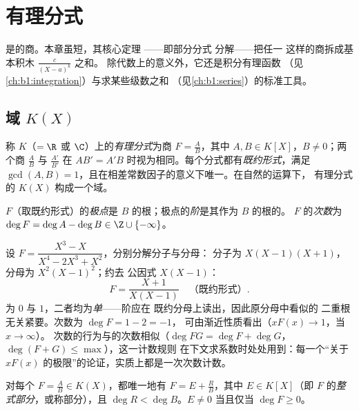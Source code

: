 \chapter{有理分式}\label{ch:b1:fractions}

是的商。本章虽短，其核心定理
——即部分分式
分解——把任一
这样的商拆成基本积木 $\frac{c}{(X - a)^k}$ 之和。
除代数上的意义外，它还是积分有理函数
（见\cref{ch:b1:integration}）与求某些级数之和
（见\cref{ch:b1:series}）的标准工具。

\section{域 $K(X)$}

\begin{definition}\label{def:b1:fractions:field}
称 $K$（$= \R$
或 $\C$）上的\emph{有理分式}为商 $F = \frac{A}{B}$，其中 $A, B \in K[X]$，$B \neq
0$；两个商 $\frac AB$ 与 $\frac{A'}{B'}$ 在
$AB' = A'B$ 时视为相同。每个分式都有\emph{既约形式}，满足
$\gcd(A, B) = 1$，且在相差常数因子的意义下唯一。在自然的运算下，
有理分式的 $K(X)$ 构成一个域。

$F$（取既约形式）的\emph{极点}是
$B$ 的根；极点的\emph{阶}是其作为 $B$ 的根的。
$F$ 的\emph{次数}为 $\deg F = \deg A - \deg B \in \Z \cup
\{-\infty\}$。
\end{definition}

\begin{example}\label{ex:b1:fractions:vocab}
设 $F = \dfrac{X^3 - X}{X^4 - 2X^3 + X^2}$，分别分解分子与分母：
分子为 $X(X-1)(X+1)$，分母为 $X^2(X-1)^2$；约去
公因式 $X(X-1)$：
\[
F = \frac{X + 1}{X(X - 1)} \quad\text{（既约形式）.}
\]
为 $0$ 与 $1$，二者均为\emph{单}——阶应在
既约分母上读出，因此原分母中看似的
二重根无关紧要。次数为 $\deg F = 1 - 2 = -1$，
可由渐近性质看出（$xF(x) \to 1$，当 $x \to \infty$）。
次数的行为与的次数相似（$\deg FG = \deg F +
\deg G$，$\deg(F + G) \leq \max$），这一计数规则
在下文求系数时处处用到：每一个“关于
$xF(x)$ 的极限”的论证，实质上都是一次次数计数。
\end{example}

\begin{proposition}[整式部分]\label{prop:b1:fractions:integerpart}
对每个 $F = \frac AB \in K(X)$，都唯一地有 $F = E + \frac RB$，其中 $E
\in K[X]$（即 $F$ 的\emph{整式部分}，或称部分），且
$\deg R < \deg B$。$E \neq 0$ 当且仅当 $\deg F \geq 0$。
\end{proposition}

